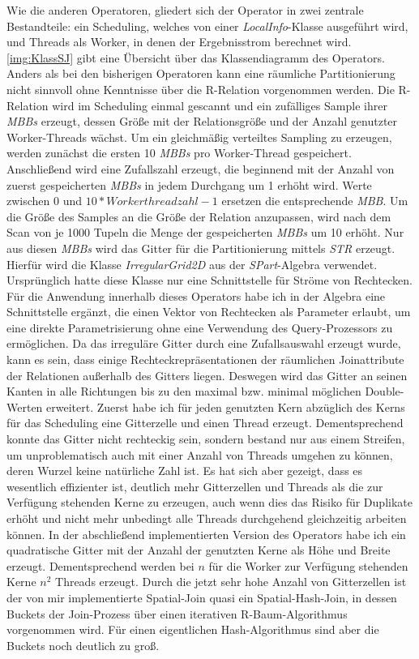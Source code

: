 \documentclass[a4paper,12pt,twoside]{article}
\newcommand{\Fb}[1]{\textit{#1}} %
\begin{document}
Wie die anderen Operatoren, gliedert sich der Operator in zwei zentrale Bestandteile: ein Scheduling, welches von einer \Fb{LocalInfo}-Klasse ausgeführt wird, und Threads als Worker, in denen der Ergebnisstrom berechnet wird. \autoref{img:KlassSJ} gibt eine Übersicht über das Klassendiagramm des Operators. Anders als bei den bisherigen Operatoren kann eine räumliche Partitionierung nicht sinnvoll ohne Kenntnisse über die R-Relation vorgenommen werden. Die R-Relation wird im Scheduling einmal gescannt und ein zufälliges Sample ihrer \Fb{MBBs} erzeugt, dessen Größe mit der Relationsgröße und der Anzahl genutzter Worker-Threads wächst. Um ein gleichmäßig verteiltes Sampling zu erzeugen, werden zunächst die ersten 10 \Fb{MBBs} pro Worker-Thread gespeichert. Anschließend wird eine Zufallszahl erzeugt, die beginnend mit der Anzahl von zuerst gespeicherten \Fb{MBBs} in jedem Durchgang um 1 erhöht wird. Werte zwischen 0 und $10 * Workerthreadzahl - 1$ ersetzen die entsprechende \Fb{MBB}. Um die Größe des Samples an die Größe der Relation anzupassen, wird nach dem Scan von je 1000 Tupeln die Menge der gespeicherten \Fb{MBBs} um 10 erhöht. Nur aus diesen \Fb{MBBs} wird das Gitter für die Partitionierung mittels \Fb{STR} erzeugt. Hierfür wird die Klasse \Fb{IrregularGrid2D} aus der \Fb{SPart}-Algebra verwendet. Ursprünglich hatte diese Klasse nur eine Schnittstelle für Ströme von Rechtecken. Für die Anwendung innerhalb dieses Operators habe ich in der Algebra eine Schnittstelle ergänzt, die einen Vektor von Rechtecken als Parameter erlaubt, um eine direkte Parametrisierung ohne eine Verwendung des Query-Prozessors zu ermöglichen. Da das irreguläre Gitter durch eine Zufallsauswahl erzeugt wurde, kann es sein, dass einige Rechteckrepräsentationen der räumlichen Joinattribute der Relationen außerhalb des Gitters liegen. Deswegen wird das Gitter an seinen Kanten in alle Richtungen bis zu den maximal bzw. minimal möglichen Double-Werten erweitert. Zuerst habe ich für jeden genutzten Kern abzüglich des Kerns für das Scheduling eine Gitterzelle und einen Thread erzeugt. Dementsprechend konnte das Gitter nicht rechteckig sein, sondern bestand nur aus einem Streifen, um unproblematisch auch mit einer Anzahl von Threads umgehen zu können, deren Wurzel keine natürliche Zahl ist. Es hat sich aber gezeigt, dass es wesentlich effizienter ist, deutlich mehr Gitterzellen und Threads als die zur Verfügung stehenden Kerne zu erzeugen, auch wenn dies das Risiko für Duplikate erhöht und nicht mehr unbedingt alle Threads durchgehend gleichzeitig arbeiten können. In der abschließend implementierten Version des Operators habe ich ein quadratische Gitter mit der Anzahl der genutzten Kerne als Höhe und Breite erzeugt. Dementsprechend werden bei $n$ für die Worker zur Verfügung stehenden Kerne $n^2$ Threads erzeugt. Durch die jetzt sehr hohe Anzahl von Gitterzellen ist der von mir implementierte Spatial-Join quasi ein Spatial-Hash-Join, in dessen Buckets der Join-Prozess über einen iterativen R-Baum-Algorithmus vorgenommen wird. Für einen eigentlichen  Hash-Algorithmus sind aber die Buckets noch deutlich zu groß.
\end{document}
